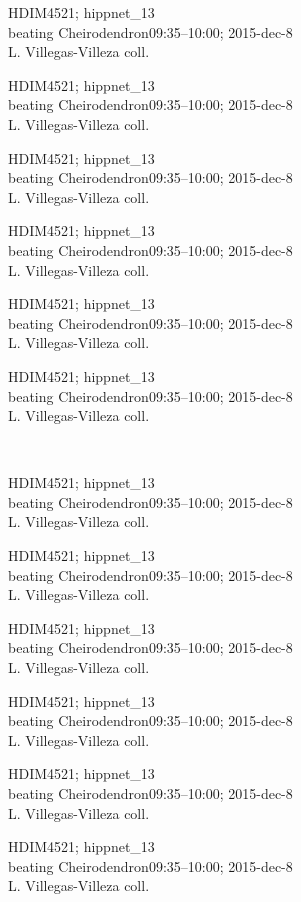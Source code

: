 \documentclass[2pt]{extarticle}
\begin{document}
\noindent
\parbox{0.16\textwidth}{\tiny \raggedright \rule[-0.3\baselineskip]{0pt}{10pt}HDIM4521; hippnet\_13\\ beating Cheirodendron09:35--10:00; 2015-dec-8\\ L. Villegas-Villeza coll.}
\parbox{0.16\textwidth}{\tiny \raggedright \rule[-0.3\baselineskip]{0pt}{10pt}HDIM4521; hippnet\_13\\ beating Cheirodendron09:35--10:00; 2015-dec-8\\ L. Villegas-Villeza coll.}
\parbox{0.16\textwidth}{\tiny \raggedright \rule[-0.3\baselineskip]{0pt}{10pt}HDIM4521; hippnet\_13\\ beating Cheirodendron09:35--10:00; 2015-dec-8\\ L. Villegas-Villeza coll.}
\parbox{0.16\textwidth}{\tiny \raggedright \rule[-0.3\baselineskip]{0pt}{10pt}HDIM4521; hippnet\_13\\ beating Cheirodendron09:35--10:00; 2015-dec-8\\ L. Villegas-Villeza coll.}
\parbox{0.16\textwidth}{\tiny \raggedright \rule[-0.3\baselineskip]{0pt}{10pt}HDIM4521; hippnet\_13\\ beating Cheirodendron09:35--10:00; 2015-dec-8\\ L. Villegas-Villeza coll.}
\parbox{0.16\textwidth}{\tiny \raggedright \rule[-0.3\baselineskip]{0pt}{10pt}HDIM4521; hippnet\_13\\ beating Cheirodendron09:35--10:00; 2015-dec-8\\ L. Villegas-Villeza coll.} \\ 
\vspace{0.001in} 

\noindent
\parbox{0.16\textwidth}{\tiny \raggedright \rule[-0.3\baselineskip]{0pt}{10pt}HDIM4521; hippnet\_13\\ beating Cheirodendron09:35--10:00; 2015-dec-8\\ L. Villegas-Villeza coll.}
\parbox{0.16\textwidth}{\tiny \raggedright \rule[-0.3\baselineskip]{0pt}{10pt}HDIM4521; hippnet\_13\\ beating Cheirodendron09:35--10:00; 2015-dec-8\\ L. Villegas-Villeza coll.}
\parbox{0.16\textwidth}{\tiny \raggedright \rule[-0.3\baselineskip]{0pt}{10pt}HDIM4521; hippnet\_13\\ beating Cheirodendron09:35--10:00; 2015-dec-8\\ L. Villegas-Villeza coll.}
\parbox{0.16\textwidth}{\tiny \raggedright \rule[-0.3\baselineskip]{0pt}{10pt}HDIM4521; hippnet\_13\\ beating Cheirodendron09:35--10:00; 2015-dec-8\\ L. Villegas-Villeza coll.}
\parbox{0.16\textwidth}{\tiny \raggedright \rule[-0.3\baselineskip]{0pt}{10pt}HDIM4521; hippnet\_13\\ beating Cheirodendron09:35--10:00; 2015-dec-8\\ L. Villegas-Villeza coll.}
\parbox{0.16\textwidth}{\tiny \raggedright \rule[-0.3\baselineskip]{0pt}{10pt}HDIM4521; hippnet\_13\\ beating Cheirodendron09:35--10:00; 2015-dec-8\\ L. Villegas-Villeza coll.} \\ 
\vspace{0.001in} 
\end{document}
